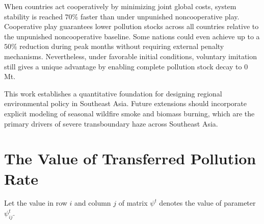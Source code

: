 \documentclass[a4paper,fleqn]{cas-dc}
\begin{document}
When countries act cooperatively by minimizing joint global costs, system stability is reached $70\%$ faster than under unpunished noncooperative play. Cooperative play guarantees lower pollution stocks across all countries relative to the unpunished noncooperative baseline. Some nations could even achieve up to a $50\%$ reduction during peak months without requiring external penalty mechanisms. Nevertheless, under favorable initial conditions, voluntary imitation still gives a unique advantage by enabling complete pollution stock decay to 0 Mt.

This work establishes a quantitative foundation for designing regional environmental policy in Southeast Asia. Future extensions should incorporate explicit modeling of seasonal wildfire smoke and biomass burning, which are the primary drivers of severe transboundary haze across Southeast Asia.

\printcredits

% 


\appendix

\section{The Value of Transferred Pollution Rate} \label{appendix:pollution rate}

Let the value in row $i$ and column $j$ of matrix $\psi^t$ denotes the value of parameter $\psi_{ij}^t$.
\end{document}
